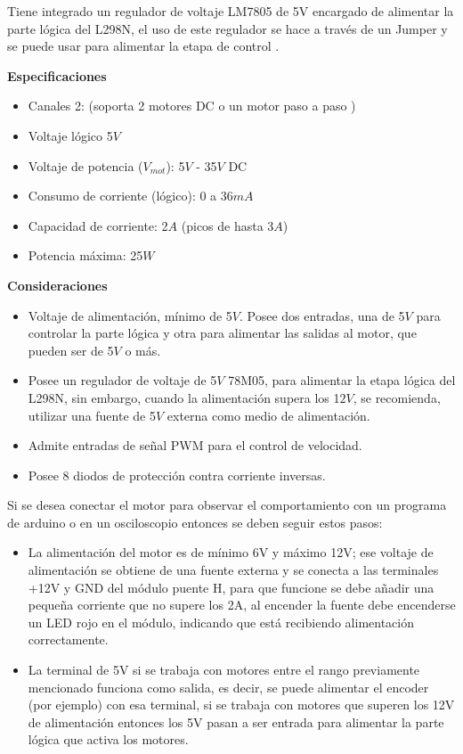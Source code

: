 \documentclass[12pt,letterpaper,notitlepage]{report}
\newlength{\spacing} \setlength{\spacing}{\baselineskip}
\newcommand{\nspace}[1]{\setlength{\baselineskip}{#1\spacing}}
\newenvironment{linespacing}[1]{\nspace{#1}}{}
\begin{document}
{\begin{linespacing}{1.5}
Tiene integrado un regulador de voltaje LM7805 de 5V encargado de alimentar la parte lógica del L298N, el uso de este regulador se hace a través de un Jumper y se puede usar para alimentar la etapa de control \cite{naylampmechatronics}.

\textbf{Especificaciones}
\begin{itemize}
	\item Canales 2: (soporta 2 motores DC o un motor paso a paso )
	\item Voltaje lógico 5$V$
	\item Voltaje de potencia ($V_{mot}$): 5$V$ - 35$V$ DC
	\item Consumo de corriente (lógico): 0 a 36$mA$
	\item Capacidad de corriente: 2$A$ (picos de hasta 3$A$)
	\item Potencia máxima: 25$W$
\end{itemize}
\textbf{Consideraciones}
\begin{itemize}
	\item Voltaje de alimentación, mínimo de 5$V$. Posee dos entradas, una de 5$V$ para controlar la parte lógica y otra para alimentar las salidas al motor, que pueden ser de 5$V$ o más.
	\item Posee un regulador de voltaje de 5$V$ 78M05, para alimentar la etapa lógica del L298N, sin embargo, cuando la alimentación supera los 1$2V$, se recomienda, utilizar una fuente de 5$V$ externa como medio de alimentación. 
	\item Admite entradas de señal PWM para el control de velocidad. 
	\item Posee 8 diodos de protección contra corriente inversas. 
\end{itemize}
Si se desea conectar el motor para observar el comportamiento con un programa de arduino o en un osciloscopio entonces se deben seguir estos pasos:
\begin{itemize}
	\item La alimentación del motor es de mínimo 6V y máximo 12V; ese voltaje de alimentación se obtiene de una fuente externa y se conecta a las terminales +12V y GND del módulo puente H, para que funcione se debe añadir una pequeña corriente que no supere los 2A, al encender la fuente debe encenderse un LED rojo en el módulo, indicando que está recibiendo alimentación correctamente.
	\item La terminal de 5V si se trabaja con motores entre el rango previamente mencionado funciona como salida, es decir, se puede alimentar el encoder (por ejemplo) con esa terminal, si se trabaja con motores que superen los 12V de alimentación entonces los 5V pasan a ser entrada para alimentar la parte lógica que activa los motores.

\end{itemize}
\end{linespacing}}
\end{document}
